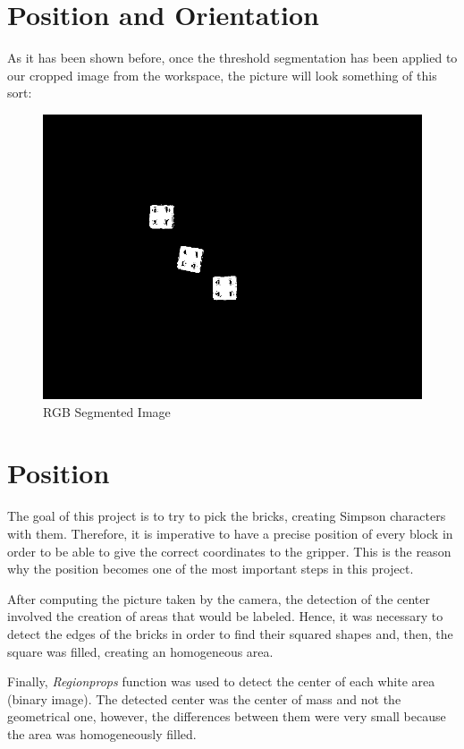 \section{Position and Orientation}\label{ch:position_rotation}

As it has been shown before, once the threshold segmentation has been applied to our cropped image from the workspace, the picture will look something of this sort:

\begin{figure}[h]
  \centering
  \includegraphics[scale=0.3]{figures/thresh_img.png}
  \caption[thresholded_image] {RGB Segmented Image}
\end{figure}

\section{Position}
The goal of this project is to try to pick the bricks, creating Simpson characters with them. Therefore, it is imperative to have a precise position of every block in order to be able to give the correct coordinates to the gripper. This is the reason why the position becomes one of the most important steps in this project.

After computing the picture taken by the camera, the detection of the center involved the creation of areas that would be labeled. Hence, it was necessary to detect the edges of the bricks in order to find their squared shapes and, then, the square was filled, creating an homogeneous area.

Finally, \textit{Regionprops} function was used to detect the center of each white area (binary image). The detected center was the center of mass and not the geometrical one, however, the differences between them were very small because the area was homogeneously filled.


